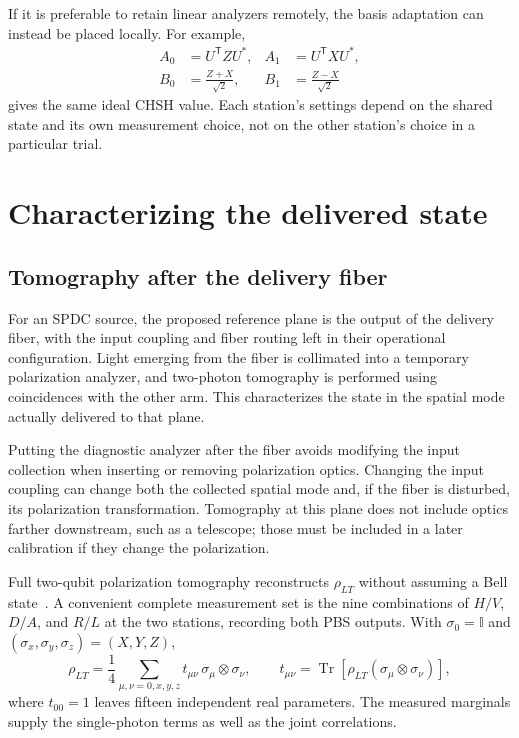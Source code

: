 \documentclass[a4paper,10pt]{article}
\newcommand{\I}{\mathbb{I}}
\newcommand{\Tr}{\operatorname{Tr}}
\begin{document}
If it is preferable to retain linear analyzers remotely, the basis
adaptation can instead be placed locally. For example,
\begin{equation}
    \begin{aligned}
        A_0&=U^{\mathsf T}ZU^*,&
        A_1&=U^{\mathsf T}XU^*,\\
        B_0&=\frac{Z+X}{\sqrt{2}},&
        B_1&=\frac{Z-X}{\sqrt{2}}
    \end{aligned}
    \label{eq:local-adapted-chsh}
\end{equation}
gives the same ideal CHSH value. Each station's settings depend on the
shared state and its own measurement choice, not on the other station's
choice in a particular trial.

\section{Characterizing the delivered state}

\subsection{Tomography after the delivery fiber}

For an SPDC source, the proposed reference plane is the output of the
delivery fiber, with the input coupling and fiber routing left in their
operational configuration. Light emerging from the fiber is collimated
into a temporary polarization analyzer, and two-photon tomography is
performed using coincidences with the other arm. This characterizes the
state in the spatial mode actually delivered to that plane.

Putting the diagnostic analyzer after the fiber avoids modifying the
input collection when inserting or removing polarization optics.
Changing the input coupling can change both the collected spatial mode
and, if the fiber is disturbed, its polarization transformation.
Tomography at this plane does not include optics farther downstream,
such as a telescope; those must be included in a later calibration if
they change the polarization.

Full two-qubit polarization tomography reconstructs $\rho_{LT}$ without
assuming a Bell state~\cite{James2001Measurement}. A convenient complete
measurement set is the nine combinations of $H/V$, $D/A$, and $R/L$ at
the two stations, recording both PBS outputs. With
$\sigma_0=\I$ and $(\sigma_x,\sigma_y,\sigma_z)=(X,Y,Z)$,
\begin{equation}
    \rho_{LT}
    =\frac14\sum_{\mu,\nu=0,x,y,z}
        t_{\mu\nu}\,\sigma_\mu\otimes\sigma_\nu,
    \qquad
    t_{\mu\nu}=\Tr\!\left[
        \rho_{LT}(\sigma_\mu\otimes\sigma_\nu)
    \right],
    \label{eq:two-photon-tomography}
\end{equation}
where $t_{00}=1$ leaves fifteen independent real parameters. The measured
marginals supply the single-photon terms as well as the joint correlations.
\end{document}
